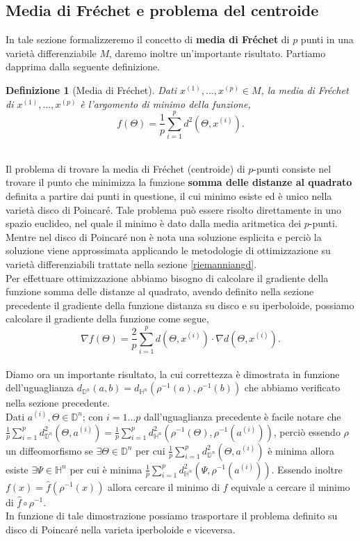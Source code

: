 \documentclass[a4paper, 12pt]{article}
\newtheorem{definition}{Definizione}
\begin{document}
\subsection{Media di Fréchet e problema del centroide}
In tale sezione formalizzeremo il concetto di \textbf{media di Fréchet} di $p$ punti in una varietà differenziabile $M$, daremo inoltre un'importante risultato. Partiamo dapprima dalla seguente definizione.
\begin{definition}[Media di Fréchet]
Dati $x^{(1)}, ..., x^{(p)} \in M$, la media di Fréchet di $x^{(1)}, ..., x^{(p)}$ è l'argomento di minimo della funzione,\\
\[f(\Theta) = \frac{1}{p}\sum_{i=1}^p d^2(\Theta, x^{(i)}).\]\\
\end{definition}
Il problema di trovare la media di Fréchet (centroide) di $p$-punti consiste nel trovare il punto che minimizza la funzione \textbf{somma delle distanze al quadrato} definita a partire dai punti in questione, il cui minimo esiste ed è unico nella varietà disco di Poincaré. Tale problema può essere risolto direttamente in uno spazio euclideo, nel quale il minimo è dato dalla media aritmetica dei $p$-punti. Mentre nel disco di Poincaré non è nota una soluzione esplicita e perciò la soluzione viene approssimata applicando le metodologie di ottimizzazione su varietà differenziabili trattate nella sezione \ref{riemanniangd}.\\
Per effettuare ottimizzazione abbiamo bisogno di calcolare il gradiente della funzione somma delle distanze al quadrato, avendo definito nella sezione precedente il gradiente della funzione distanza su disco e su iperboloide, possiamo calcolare il gradiente della funzione come segue,\\
\[\nabla f(\Theta) = \frac{2}{p} \sum_{i=1}^p d(\Theta, x^{(i)}) \cdot \nabla d(\Theta, x^{(i)}).\]\\
Diamo ora un importante risultato, la cui correttezza è dimostrata in funzione dell'uguaglianza $d_{\mathbb{D}^n}(a, b) = d_{\mathbb{H}^n}(\rho^{-1}(a), \rho^{-1}(b))$ che abbiamo verificato nella sezione precedente.\\
Dati $a^{(i)}, \Theta \in \mathbb{D}^n$; con $i = 1...p$ dall'uguaglianza precedente è facile notare che $\frac{1}{p}\sum_{i=1}^p d_{\mathbb{D}^n}^2(\Theta, a^{(i)}) = \frac{1}{p}\sum_{i=1}^p d_{\mathbb{H}^n}^2(\rho^{-1}(\Theta), \rho^{-1}(a^{(i)}))$, perciò essendo $\rho$ un diffeomorfismo se $\exists \Theta \in \mathbb{D}^n$ per cui $\frac{1}{p}\sum_{i=1}^p d_{\mathbb{D}^n}^2(\Theta, a^{(i)})$ è minima allora esiste $\exists \Psi \in \mathbb{H}^n$ per cui è minima $\frac{1}{p}\sum_{i=1}^p d_{\mathbb{H}^n}^2(\Psi, \rho^{-1}(a^{(i)}))$. Essendo inoltre $f(x) = \hat{f}(\rho^{-1}(x))$ allora cercare il minimo di $f$ equivale a cercare il minimo di $\hat{f} \circ \rho^{-1}$.\\
In funzione di tale dimostrazione possiamo trasportare il problema definito su disco di Poincaré nella varieta iperboloide e viceversa.
\end{document}
